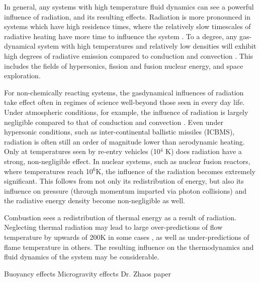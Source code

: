 In general, any systems with high temperature fluid dynamics can see a powerful influence of radiation, and its resulting effects. 
Radiation is more pronounced in systems which have high residence times, where the relatively slow timescales of radiative heating have more time to influence the system \cite{Wu2021LimitationsFires}. 
To a degree, any gas-dynamical system with high temperatures and relatively low densities will exhibit high degrees of radiative emission compared to conduction and convection \cite{Pai1966RadiationDynamics}. This includes the fields of hypersonics, fission and fusion nuclear energy, and space exploration.

For non-chemically reacting systems, the gasdynamical influences of radiation take effect often in regimes of science well-beyond those seen in every day life. Under atmospheric conditions, for example, the influence of radiation is largely negligible compared to that of conduction and convection \cite{Pai1966RadiationDynamics}.
Even under hypersonic conditions, such as inter-continental ballistic missiles (ICBMS), radiation is often still an order of magnitude lower than aerodynamic heating. Only at temperatures seen by re-entry vehicles (10$^4$ K) does radiation have a strong, non-negligible effect.
In nuclear systems, such as nuclear fusion reactors, where temperatures reach 10$^6$K, the influence of the radiation becomes extremely significant. This follows from not only its redistribution of energy, but also its influence on pressure (through momentum imparted via photon collisions) and the radiative energy density become non-negligible as well. 



Combustion sees a redistribution of thermal energy as a result of radiation. 
Neglecting thermal radiation may lead to large over-predictions of flow temperature by upwards of 200K in some cases \cite{Modest2016RadiativeSystems,Wu2021LimitationsFires,Coelho2018RadiativeSystems}, as well as under-predictions of flame temperature in others. The resulting influence on the thermodynamics and fluid dynamics of the system may be considerable.

Buoyancy effects
Microgravity effects
Dr. Zhaos paper



